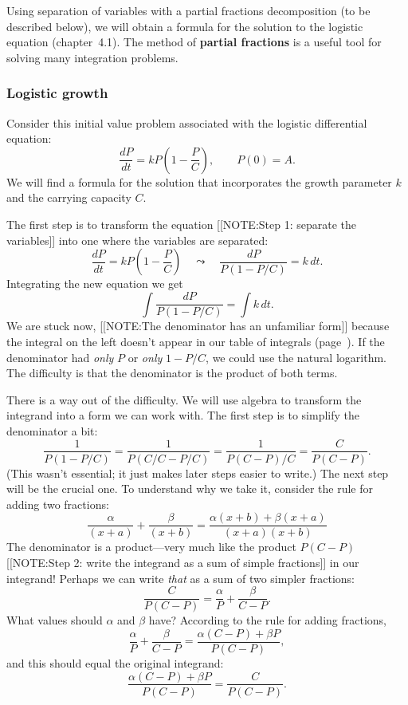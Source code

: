 Using separation of variables with a partial fractions decomposition
(to be described below), we will obtain a formula for the solution to
the logistic equation (chapter~4.1).  The method of {\bf partial
  fractions} is a useful tool for solving many integration problems.

\subsubsection{Logistic growth}
\label{subsubsec:logistic-growth}

Consider this initial value problem associated with the logistic differential equation:
\[
\dfrac{dP}{dt} = kP \left( 1 - \dfrac{P}{C} \right), \qquad P(0) = A.
\]
We will find a formula for the solution that incorporates the growth
parameter $k$ and the carrying capacity $C$.

The first step is to transform the equation 
[[NOTE:Step 1: separate  the variables]]	
into one where the variables are separated:
	\[
\dfrac{dP}{dt} = kP \left( 1 - \dfrac{P}{C} \right) \quad \leadsto
		\quad \dfrac{dP}{P (1 - P/C)} = k \, dt.
\]
Integrating the new equation we get
	\[
\int \dfrac{dP}{P (1 - P/C)} = \int k \, dt.
\]
We are stuck now, 
[[NOTE:The denominator has an unfamiliar form]]
because the integral on the left doesn't appear in our table of
integrals (page~\pageref{table}).  If the denominator had {\em only\/}
$P$ or {\em only\/} $1 - P/C$, we could use the natural logarithm.
The difficulty is that the denominator is the product of both terms.

There is a way out of the difficulty.  We will use algebra to
transform the integrand into a form we can work with.  The first step
is to simplify the denominator a bit:
\[
\dfrac{1}{P(1 - P/C)} = \dfrac{1}{P(C/C - P/C)} = \dfrac{1}{P(C - P)/C}
		= \dfrac{C}{P(C - P)}.
\]
(This wasn't essential; it just makes later steps easier to write.)
The next step will be the crucial one.  To understand why we take it,
consider the rule for adding two fractions:
	\[
\dfrac{\alpha}{(x + a)} + \dfrac{\beta}{(x + b)} = 
		\dfrac{\alpha (x + b) + \beta (x + a)}{(x + a) (x + b)}
\]
The denominator is a product---very much like the product $P(C - P)$ 
[[NOTE:Step 2: write the integrand as a sum  of simple fractions]]
in our integrand!  Perhaps we can write {\em that\/} as a sum of two
simpler fractions:
	\[
\dfrac{C}{P(C - P)} = \dfrac{\alpha}{P} + \dfrac{\beta}{C - P}.
\]
What values should $\alpha$ and $\beta$ have?  According to the rule
for adding fractions,
	\[
\dfrac{\alpha}{P} + \dfrac{\beta}{C - P} = 
		\dfrac{\alpha (C - P) + \beta P}{P(C - P)},
\]
and this should equal the original integrand:
	\[
\dfrac{\alpha (C - P) + \beta P}{P(C - P)} = \dfrac{C}{P(C - P)}.
\]


